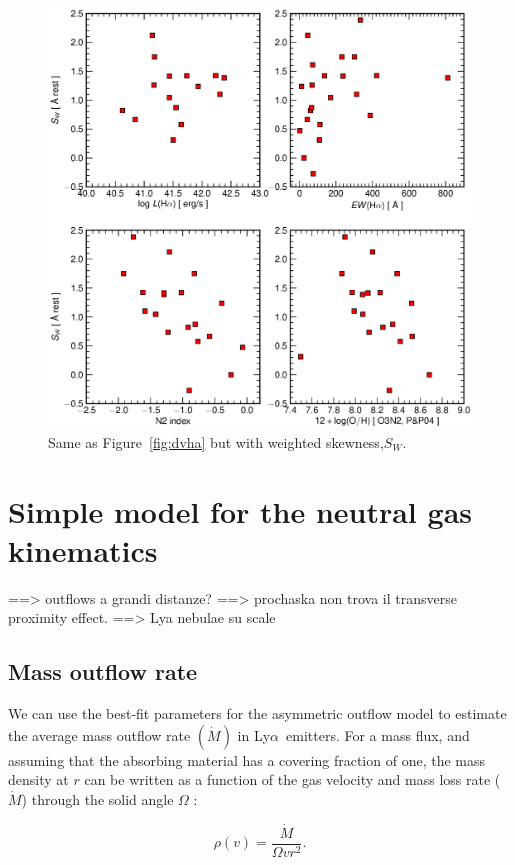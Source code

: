 \documentclass[manuscript]{emulateapj}
\newcommand{\lya}{Ly$\alpha$}
\begin{document}
\begin{figure}[t!]
   \centering
   \includegraphics[scale=.4]{swr_ha.eps}
   \caption{ Same as Figure~\ref{fig:dvha} but with weighted skewness,$S_W$. }
   \label{fig:asymha}
\end{figure}




\section{Simple model for the neutral gas kinematics}


==> outflows a grandi distanze?
==> prochaska non trova il transverse proximity effect.
==> Lya nebulae su scale 

\subsection{Mass outflow rate}
We can use the best-fit parameters for the asymmetric outflow model to
estimate the average mass outflow rate $(\dot{M})$ in \lya\ emitters.
For a mass flux, and assuming that the absorbing material has a
covering fraction of one, the mass density at $r$ can be written as a
function of the gas velocity and mass loss rate ($\dot{M}$) through
the solid angle $\Omega$ \citep[e.g.,][]{martin2013}:

\begin{equation}
\rho(v)=\frac{\dot{M}}{\Omega vr^2}.
\label{eqn:density}
\end{equation} 
\end{document}
